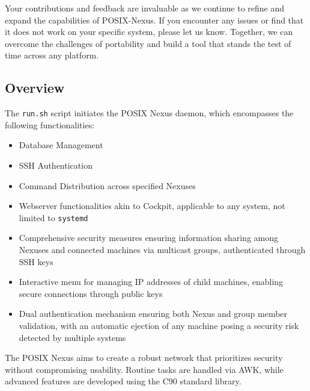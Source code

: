 Your contributions and feedback are invaluable as we continue to refine and expand the capabilities of POSIX-Nexus. If you encounter any issues or find that it does not work on your specific system, please let us know. Together, we can overcome the challenges of portability and build a tool that stands the test of time across any platform.

\newpage
\subsection{Overview}

The \texttt{run.sh} script initiates the POSIX Nexus daemon, which encompasses the following functionalities:

\begin{itemize}
    \item Database Management
    \item SSH Authentication
    \item Command Distribution across specified Nexuses
    \item Webserver functionalities akin to Cockpit, applicable to any system, not limited to \texttt{systemd}
    \item Comprehensive security measures ensuring information sharing among Nexuses and connected machines via multicast groups, authenticated through SSH keys
    \item Interactive menu for managing IP addresses of child machines, enabling secure connections through public keys
    \item Dual authentication mechanism ensuring both Nexus and group member validation, with an automatic ejection of any machine posing a security risk detected by multiple systems
\end{itemize}

The POSIX Nexus aims to create a robust network that prioritizes security without compromising usability. Routine tasks are handled via AWK, while advanced features are developed using the C90 standard library.
\newpage